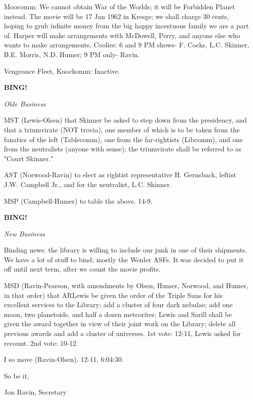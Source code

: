 \documentclass[12pt]{article}
\newcommand{\bing}{{\bf BING!} }
\newcommand{\goto}[1]{\bing \vskip 12pt \centerline{{\em{#1}}}}
\begin{document}
Moocomm: We cannot obtain War of the Worlds; it will be Forbidden Planet instead. The movie will be 17 Jan 1962 in Kresge; we shall charge 30 cents, hoping to grub infinite money from the big happy incestuous family we are a part of. Harper will make arrangements with McDowell, Perry, and anyone else who wants to make arrangements. Coolies: 6 and 9 PM shows- F. Cocks, L.C. Skinner, B.E. Morris, N.D. Humer; 9 PM only- Ravin.

Vengeance Fleet, Knockomm: Inactive.

\goto{Olde Business}

MST (Lewis-Olsen) that Skinner be asked to step down from the presidency, and that a triumvirate (NOT trovia), one member of which is to be taken from the fanatics of the left (Tablecomm), one from the far-rightists (Libcomm), and one from the neutralists (anyone with sense); the triumvirate shall be referred to as "Court Skinner."

AST (Norwood-Ravin) to elect as rightist representative H. Gernsback, leftist J.W. Campbell Jr., and for the neutralist, L.C. Skinner.

MSP (Campbell-Humer) to table the above. 14-9.

\goto{New Business}

Binding news: the library is willing to include our junk in one of their shipments. We have a lot of stuff to bind; mostly the Wenler ASFs. It was decided to put it off until next term, after we count the movie profits.

MSD (Ravin-Pearson, with amendments by Olsen, Humer, Norwood, and Humer, in that order) that ARLewis be given the order of the Triple Suns for his excellent services to the Library; add a cluster of four dark nebulae; add one moon, two planetoids, and half a dozen meteorites; Lewis and Sarill shall be given the award together in view of their joint work on the Library; delete all previous awards and add a cluster of universes. 1st vote: 12-11, Lewis asked for recount. 2nd vote: 10-12.

I so move (Ravin-Olsen). 12-11, 6:04:30.

\vspace{12pt}

\centerline{So be it,}
\centerline{Jon Ravin, Secretary}
\end{document}
